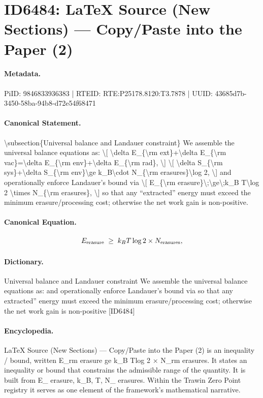 \section*{ID6484: LaTeX Source (New Sections) — Copy/Paste into the Paper (2)}
\paragraph{Metadata.}
PiID: 9846833936383 | RTEID: RTE:P25178.8120:T3.7878 | UUID: 43685d7b-3450-58ba-94b8-d72e54f68471

\paragraph{Canonical Statement.}
\textbackslash{}subsection\{Universal balance and Landauer constraint\} We assemble the universal balance equations as: \textbackslash{}[ \textbackslash{}delta E\_\{\textbackslash{}rm ext\}+\textbackslash{}delta E\_\{\textbackslash{}rm vac\}=\textbackslash{}delta E\_\{\textbackslash{}rm env\}+\textbackslash{}delta E\_\{\textbackslash{}rm rad\}, \textbackslash{}] \textbackslash{}[ \textbackslash{}delta S\_\{\textbackslash{}rm sys\}+\textbackslash{}delta S\_\{\textbackslash{}rm env\}\textbackslash{}ge k\_B\textbackslash{}cdot N\_\{\textbackslash{}rm erasures\}\textbackslash{}log 2, \textbackslash{}] and operationally enforce Landauer's bound via \textbackslash{}[ E\_\{\textbackslash{}rm erasure\}\textbackslash{};\textbackslash{}ge\textbackslash{};k\_B T\textbackslash{}log 2 \textbackslash{}times N\_\{\textbackslash{}rm erasures\}, \textbackslash{}] so that any ``extracted'' energy must exceed the minimum erasure/processing cost; otherwise the net work gain is non-positive.

\paragraph{Canonical Equation.}
\[
E_{\rm erasure}\;\ge\;k_B T\log 2 \times N_{\rm erasures},
\]

\paragraph{Dictionary.}
Universal balance and Landauer constraint We assemble the universal balance equations as: and operationally enforce Landauer's bound via so that any extracted'' energy must exceed the minimum erasure/processing cost; otherwise the net work gain is non-positive [ID6484]

\paragraph{Encyclopedia.}
LaTeX Source (New Sections) — Copy/Paste into the Paper (2) is an inequality / bound, written E\_rm erasure ge k\_B Tlog 2 × N\_rm erasures. It states an inequality or bound that constrains the admissible range of the quantity. It is built from E\_ erasure, k\_B, T, N\_ erasures. Within the Trawin Zero Point registry it serves as one element of the framework's mathematical narrative.
